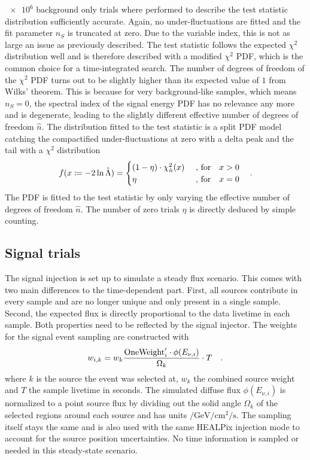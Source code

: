 $\num{e6}$ background only trials where performed to describe the test statistic distribution sufficiently accurate.
Again, no under-fluctuations are fitted and the fit parameter $n_S$ is truncated at zero.
Due to the variable index, this is not as large an issue as previously described.
The test statistic follows the expected $\chi^2$ distribution well and is therefore described with a modified $\chi^2$ PDF, which is the common choice for a time-integrated search.
The number of degrees of freedom of the $\chi^2$ PDF turns out to be slightly higher than its expected value of $\num{1}$ from Wilks' theorem.
This is because for very background-like samples, which means $n_S=0$, the spectral index of the signal energy PDF has no relevance any more and is degenerate, leading to the slightly different effective number of degrees of freedom $\hat{n}$.
The distribution fitted to the test statistic is a split PDF model catching the compactified under-fluctuations at zero with a delta peak and the tail with a $\chi^2$ distribution
\begin{equation}
  f(x \coloneqq -2\ln\hat{\Lambda}) =
  \begin{cases}
    (1 - \eta) \cdot \chi^2_{\hat{n}}(x) &\text{ , for}\quad x > 0 \\
    \eta &\text{ , for}\quad x = 0
  \end{cases}
  \quad\text{.}
\end{equation}
The PDF is fitted to the test statistic by only varying the effective number of degrees of freedom $\hat{n}$.
The number of zero trials $\eta$ is directly deduced by simple counting.

\subsection*{Signal trials}
The signal injection is set up to simulate a steady flux scenario.
This comes with two main differences to the time-dependent part.
First, all sources contribute in every sample and are no longer unique and only present in a single sample.
Second, the expected flux is directly proportional to the data livetime in each sample.
Both properties need to be reflected by the signal injector.
The weights for the signal event sampling are constructed with
\begin{equation}
  w_{i,k} = w_k \frac{\text{OneWeight}'_i \cdot
    \phi(E_{\nu,i})}{\Omega_k} \cdot T
  \quad\text{.}
\end{equation}
where $k$ is the source the event was selected at, $w_k$ the combined source weight and $T$ the sample livetime in seconds.
The simulated diffuse flux $\phi(E_{\nu,i})$ is normalized to a point source flux by dividing out the solid angle $\Omega_k$ of the selected regions around each source and has units $\si{\per\GeV\per\cm\squared\per\second}$.
The sampling itself stays the same and is also used with the same HEALPix injection mode to account for the source position uncertainties.
No time information is sampled or needed in this steady-state scenario.

